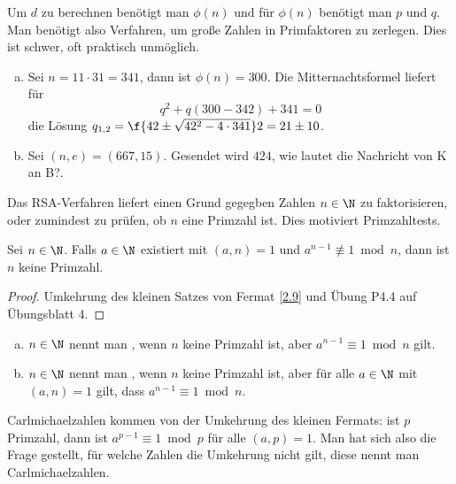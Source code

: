 Um $d$ zu berechnen benötigt man $\phi(n)$ und für $\phi(n)$ benötigt man $p$ und $q$.
Man benötigt also Verfahren, um große Zahlen in Primfaktoren zu zerlegen.
Dies ist schwer, oft praktisch unmöglich.



\begin{ex} \label{3.4}
	\begin{enumerate}[a)]
		\item
			Sei $n = 11 \cdot 31 = 341$, dann ist $\phi(n) = 300$.
			Die Mitternachtsformel liefert für
			\[
				q^2 + q(300 - 342) + 341 = 0
			\]
			die Lösung $q_{1,2} = \f{42 \pm \sqrt{42^2 - 4\cdot 341}}2 = 21 \pm 10$.
		\item
			Sei $(n, e) = (667, 15)$.
			Gesendet wird $424$, wie lautet die Nachricht von K an B?.
	\end{enumerate}
\end{ex}

Das RSA-Verfahren liefert einen Grund gegegben Zahlen $n \in \N$ zu faktorisieren, oder zumindest zu prüfen, ob $n$ eine Primzahl ist.
Dies motiviert Primzahltests.

\begin{prop} \label{3.5}
	Sei $n \in \N$.
	Falls $a \in \N$ existiert mit $(a,n) = 1$ und $a^{n-1} \not\equiv 1 \bmod n$, dann ist $n$ keine Primzahl.
	\begin{proof}
		Umkehrung des kleinen Satzes von Fermat \ref{2.9} und Übung P4.4 auf Übungsblatt 4.
	\end{proof}
\end{prop}

\begin{df} \label{3.6}
	\begin{enumerate}[a)]
		\item
			$n \in \N$ nennt man , wenn $n$ keine Primzahl ist, aber $a^{n-1} \equiv 1 \bmod n$ gilt.
		\item
			$n \in \N$ nennt man , wenn $n$ keine Primzahl ist, aber für alle $a \in \N$ mit $(a,n) = 1$ gilt, dass $a^{n-1} \equiv 1 \bmod n$.
	\end{enumerate}
	\begin{note}
		Carlmichaelzahlen  kommen von der Umkehrung des kleinen Fermats: ist $p$ Primzahl, dann ist $a^{p-1} \equiv 1 \bmod p$ für alle $(a,p) = 1$.
		Man hat sich also die Frage gestellt, für welche Zahlen die Umkehrung nicht gilt, diese nennt man Carlmichaelzahlen.
	\end{note}
\end{df}

